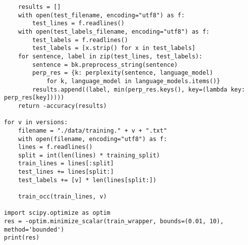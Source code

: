 \documentclass[
12pt,
a4paper,
oneside,
headinclude,
footinclude]{article}
\theoremstyle{definition} %
\begin{document}
\begin{verbatim}
    results = []
    with open(test_filename, encoding="utf8") as f:
        test_lines = f.readlines()
    with open(test_labels_filename, encoding="utf8") as f:
        test_labels = f.readlines()
        test_labels = [x.strip() for x in test_labels]
    for sentence, label in zip(test_lines, test_labels):
        sentence = bk.preprocess_string(sentence)
        perp_res = {k: perplexity(sentence, language_model) 
            for k, language_model in language_models.items()}
        results.append((label, min(perp_res.keys(), key=(lambda key: perp_res[key]))))
    return -accuracy(results)  
    
for v in versions:
    filename = "./data/training." + v + ".txt"
    with open(filename, encoding="utf8") as f:
    lines = f.readlines()
    split = int(len(lines) * training_split)
    train_lines = lines[:split]
    test_lines += lines[split:]
    test_labels += [v] * len(lines[split:])

    train_occ(train_lines, v)
    
import scipy.optimize as optim
res = -optim.minimize_scalar(train_wrapper, bounds=(0.01, 10), method='bounded')
print(res)

\end{verbatim}


\end{document}
